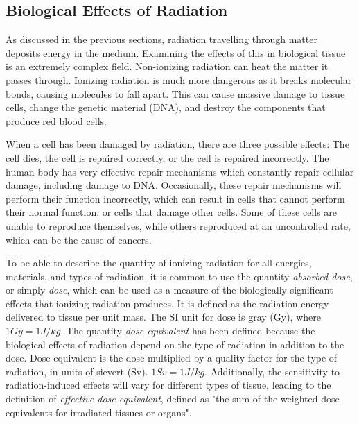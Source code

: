 \documentclass[../main/thesis.tex]{subfiles}
\begin{document}
\subsection{Biological Effects of Radiation}
\label{t-bio}
As discussed in the previous sections, radiation travelling through matter deposits energy in the medium. Examining the effects of this in biological tissue is an extremely complex field. Non-ionizing radiation can heat the matter it passes through. Ionizing radiation is much more dangerous as it breaks molecular bonds, causing molecules to fall apart. This can cause massive damage to tissue cells, change the genetic material (DNA), and destroy the components that produce red blood cells. \citep[chap. 43]{UniversityPhysics} 

When a cell has been damaged by radiation, there are three possible effects: The cell dies, the cell is repaired correctly, or the cell is repaired incorrectly. The human body has very effective repair mechanisms which constantly repair cellular damage, including damage to DNA. Occasionally, these repair mechanisms will perform their function incorrectly, which can result in cells that cannot perform their normal function, or cells that damage other cells. Some of these cells are unable to reproduce themselves, while others reproduced at an uncontrolled rate, which can be the cause of cancers.\citetext{\citeauthor{jlab}}

To be able to describe the quantity of ionizing radiation for all energies, materials, and types of radiation, it is common to use the quantity \textit{absorbed dose}, or simply \textit{dose}, which can be used as a measure of the biologically significant effects that ionizing radiation produces. It is defined as the radiation energy delivered to tissue per unit mass. The SI unit for dose is gray (Gy), where $1 Gy = 1 J/kg$. The quantity \textit{dose equivalent} has been defined because the biological effects of radiation depend on the type of radiation in addition to the dose. Dose equivalent is the dose multiplied by a quality factor for the type of radiation, in units of sievert (Sv). $1 Sv = 1 J/kg$. Additionally, the sensitivity to radiation-induced effects will vary for different types of tissue, leading to the definition of \textit{effective dose equivalent}, defined as "the sum of the weighted dose equivalents for irradiated tissues or organs". \citep[chap. 8 $\&$ 16]{Khan} 


\end{document}

